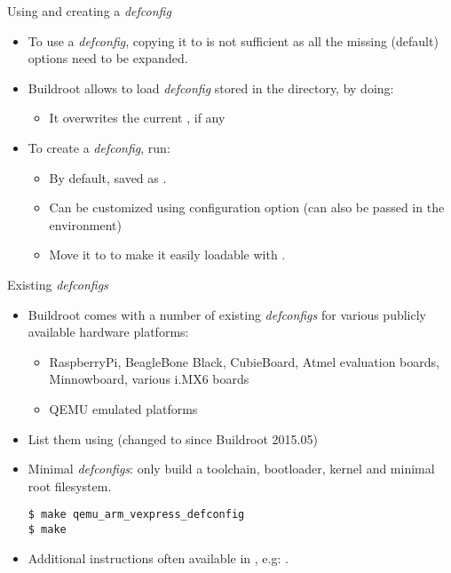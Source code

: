 \begin{frame}{Using and creating a {\em defconfig}}
  \begin{itemize}
  \item To use a {\em defconfig}, copying it to  is not
    sufficient as all the missing (default) options need to be
    expanded.
  \item Buildroot allows to load {\em defconfig} stored in the
     directory, by doing:
    \begin{itemize}
    \item It overwrites the current , if any
    \end{itemize}
  \item To create a {\em defconfig}, run:\\
    \begin{itemize}
    \item By default, saved as .
    \item Can be customized using  configuration
      option (can also be passed in the environment)
    \item Move it to  to make it easily loadable with
      .
    \end{itemize}
  \end{itemize}
\end{frame}

\begin{frame}[fragile]{Existing {\em defconfigs}}

  \begin{itemize}

  \item Buildroot comes with a number of existing {\em defconfigs} for
    various publicly available hardware platforms:
    \begin{itemize}
    \item RaspberryPi, BeagleBone Black, CubieBoard, Atmel evaluation
      boards, Minnowboard, various i.MX6 boards
    \item QEMU emulated platforms
    \end{itemize}
  \item List them using  (changed to
     since Buildroot 2015.05)
  \item Minimal {\em defconfigs}: only build a toolchain, bootloader,
    kernel and minimal root filesystem.
    \begin{block}{}
\begin{verbatim}
$ make qemu_arm_vexpress_defconfig
$ make
\end{verbatim}
\end{block}

\item Additional instructions often available in
  , e.g: .

  \end{itemize}
\end{frame}

